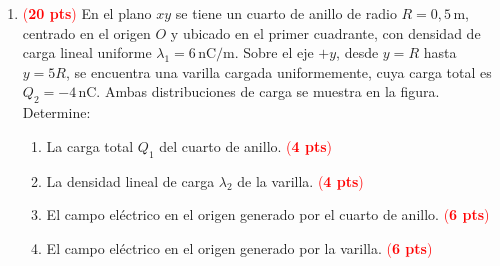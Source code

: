 \documentclass{article}
\begin{document}
\begin{enumerate}
 \item[3.] \textcolor{red}{(\textbf{20 pts})} En el plano $xy$ se tiene un cuarto de anillo de radio $R=0{,}5\,\text{m}$,
 centrado en el origen $O$ y ubicado en el primer cuadrante,
 con densidad  de carga lineal uniforme $\lambda_1 = 6\,\text{nC/m}$.
 Sobre el eje $+y$, desde $y=R$ hasta $y=5R$, se encuentra una varilla cargada uniformemente,
 cuya carga total es $Q_2=-4\,\text{nC}$.
Ambas distribuciones de carga se muestra en la figura.\\
 Determine:

\begin{minipage}{0.52\textwidth}
\begin{enumerate}[label={\alph*)}]
  \item La carga total $Q_1$ del cuarto de anillo. \textcolor{red}{(\textbf{4 pts})}
  \item La densidad lineal de carga $\lambda_2$ de la varilla. \textcolor{red}{(\textbf{4 pts})}
  \item El campo eléctrico en el origen generado por el cuarto de anillo.
        \textcolor{red}{(\textbf{6 pts})}
  \item El campo eléctrico en el origen generado por la varilla. \textcolor{red}{(\textbf{6 pts})}
\end{enumerate}
\end{minipage}
\hfill
\begin{minipage}{0.46\textwidth}
\begin{center}
\end{center}
\end{minipage}
\end{enumerate}
\end{document}
